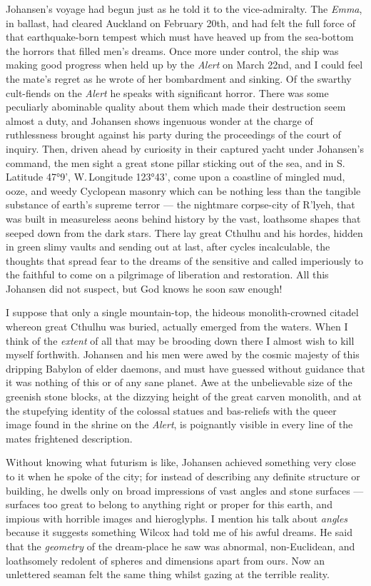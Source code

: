 \begin{pages}
\begin{Leftside}
Johansen's voyage had begun just as he told it to the vice-admiralty.
The \emph{Emma}, in ballast, had cleared Auckland on February 20th, and had
felt the full force of that earthquake-born tempest which must have
heaved up from the sea-bottom the horrors that filled men's dreams. Once
more under control, the ship was making good progress when held up by
the \emph{Alert} on March 22nd, and I could feel the mate's regret as he wrote
of her bombardment and sinking. Of the swarthy cult-fiends on the \emph{Alert}
he speaks with significant horror. There was some peculiarly abominable
quality about them which made their destruction seem almost a duty, and
Johansen shows ingenuous wonder at the charge of ruthlessness brought
against his party during the proceedings of the court of inquiry. Then,
driven ahead by curiosity in their captured yacht under Johansen's
command, the men sight a great stone pillar sticking out of the sea, and
in S.\,Latitude 47°9', W.\,Longitude 123°43', come upon a coastline of
mingled mud, ooze, and weedy Cyclopean masonry which can be nothing less
than the tangible substance of earth's supreme terror --- the nightmare
corpse-city of R'lyeh, that was built in measureless aeons behind
history by the vast, loathsome shapes that seeped down from the dark
stars. There lay great Cthulhu and his hordes, hidden in green slimy
vaults and sending out at last, after cycles incalculable, the thoughts
that spread fear to the dreams of the sensitive and called imperiously
to the faithful to come on a pilgrimage of liberation and restoration.
All this Johansen did not suspect, but God knows he soon saw enough!

I suppose that only a single mountain-top, the hideous monolith-crowned
citadel whereon great Cthulhu was buried, actually emerged from the
waters. When I think of the \emph{extent} of all that may be brooding down
there I almost wish to kill myself forthwith. Johansen and his men were
awed by the cosmic majesty of this dripping Babylon of elder daemons,
and must have guessed without guidance that it was nothing of this or of
any sane planet. Awe at the unbelievable size of the greenish stone
blocks, at the dizzying height of the great carven monolith, and at the
stupefying identity of the colossal statues and bas-reliefs with the
queer image found in the shrine on the \emph{Alert}, is poignantly visible in
every line of the mates frightened description.

Without knowing what futurism is like, Johansen achieved something very
close to it when he spoke of the city; for instead of describing any
definite structure or building, he dwells only on broad impressions of
vast angles and stone surfaces --- surfaces too great to belong to
anything right or proper for this earth, and impious with horrible
images and hieroglyphs. I mention his talk about \emph{angles} because it
suggests something Wilcox had told me of his awful dreams. He said that
the \emph{geometry} of the dream-place he saw was abnormal, non-Euclidean, and
loathsomely redolent of spheres and dimensions apart from ours. Now an
unlettered seaman felt the same thing whilst gazing at the terrible
reality.


\end{Leftside}
\end{pages}
